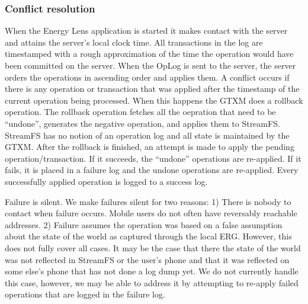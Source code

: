 \subsubsection{Conflict resolution}
When the Energy Lens application is started it makes contact with the server and attains the server's local clock time. 
All transactions in the log are timestamped with a rough approximation of the time the operation would have been committed on the server. 
When the OpLog is sent to the server, the server orders the operations in ascending order and applies them.
A conflict occurs if there is any operation or transaction that was applied after the timestamp of the current operation
being processed.  When this happens the GTXM does a rollback operation.  The rollback operation
fetches all the oepration that need to be ``undone'', generates the negative operation, and applies them to StreamFS.
StreamFS has no notion of an operation log and all state is maintained by the GTXM.  After the rollback is finished, 
an attempt is made to apply the pending operation/transaction.  If it succeeds, the ``undone'' operations are re-applied.
If it fails, it is placed in a failure log and the undone operations are re-applied.  Every successfully applied operation is logged
to a success log.

Failure is silent.  We make failures silent for two reasons: 1) There is nobody to contact when failure occurs.  Mobile
users do not often have reversably reachable addresses.  2) Failure assumes the operation was based on a false assumption about the state
of the world as captured through the local ERG.  However, this does not fully cover all cases.  It may be the case that
there the state of the world was not reflected in StreamFS or the user's phone and that it was reflected on some else's phone that
has not done a log dump yet.  We do not currently handle this case, however, we may be able to address it by attempting to re-apply
failed operations that are logged in the failure log.






